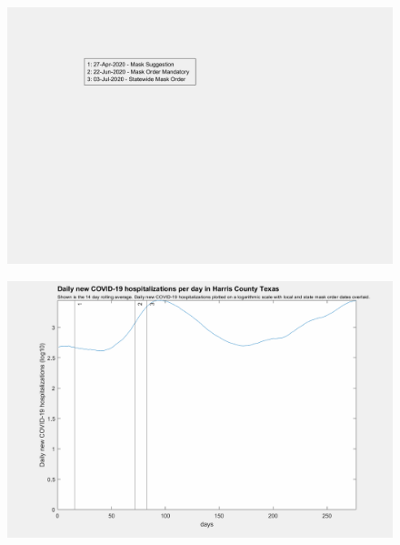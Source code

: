 \documentclass[]{article}
\begin{document}
\begin{figure}[!h]
	\includegraphics[width=\linewidth]{legends/harris_mask_order_legend.png}
	\caption{}
	\label{fig:legends/harris_mask_order_legendLabel}
\end{figure}


\begin{figure}[!h]
	\includegraphics[width=\linewidth]{images/harris_mask_order_hospitalizations_log.png}
	\caption{}
	\label{fig:images/harris_mask_order_hospitalizations_logLabel}
\end{figure}

\FloatBarrier
\end{document}
